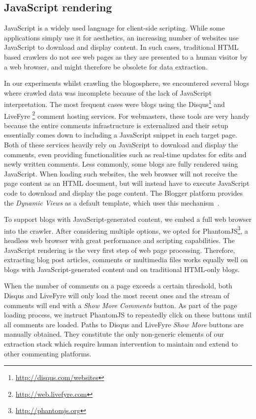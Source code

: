 \subsection{JavaScript rendering}

JavaScript is a widely used language for client-side scripting. While some applications simply use it for aesthetics, an increasing number of websites use JavaScript to download and display content. In such cases, traditional HTML based crawlers do not see web pages as they are presented to a human visitor by a web browser, and might therefore be obsolete for data extraction.

In our experiments whilst crawling the blogosphere, we encountered several blogs where crawled data was incomplete because of the lack of JavaScript interpretation. The most frequent cases were blogs using the Disqus\footnote{\url{http://disqus.com/websites}} and LiveFyre \footnote{\url{http://web.livefyre.com}} comment hosting services. For webmasters, these tools are very handy because the entire comments infrastructure is externalized and their setup essentially comes down to including a JavaScript snippet in each target page. Both of these services heavily rely on JavaScript to download and display the comments, even providing functionalities such as real-time updates for edits and newly written comments. Less commonly, some blogs are fully rendered using JavaScript. When loading such websites, the web browser will not receive the page content as an HTML document, but will instead have to execute JavaScript code to download and display the page content. The Blogger platform provides the \emph{Dynamic Views} as a default template, which uses this mechanism~\cite{antinharasymiv2011}.

To support blogs with JavaScript-generated content, we embed a full web browser into the crawler. After considering multiple options, we opted for PhantomJS\footnote{\url{http://phantomjs.org}}, a headless web browser with great performance and scripting capabilities. The JavaScript rendering is the very first step of web page processing. Therefore, extracting blog post articles, comments or multimedia files works equally well on blogs with JavaScript-generated content and on traditional HTML-only blogs.

When the number of comments on a page exceeds a certain threshold, both Disqus and LiveFyre will only load the most recent ones and the stream of comments will end with a \emph{Show More Comments} button. As part of the page loading process, we instruct PhantomJS to repeatedly click on these buttons until all comments are loaded. Paths to Disqus and LiveFyre \emph{Show More} buttons are manually obtained. They constitute the only non-generic elements of our extraction stack which require human intervention to maintain and extend to other commenting platforms.


